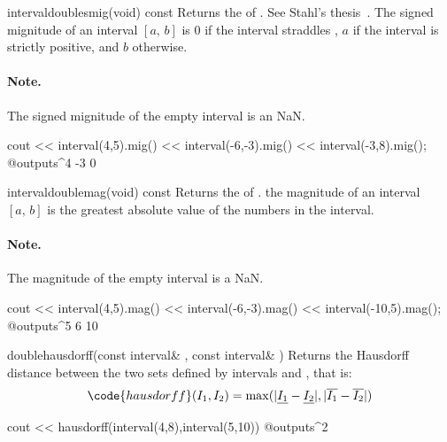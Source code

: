 \documentclass{manual}
\newcommand{\itv}[2]{\ensuremath{[#1,\,#2]}}
\newcommand{\leftBound}[1]{\ensuremath{\underline{#1}}}
\newcommand{\rightBound}[1]{\ensuremath{\overline{#1}}}
\begin{document}
\begin{defmethod}{interval}{double}{smig}{(void) const}
  Returns the  of .  See Stahl's
  thesis~. The signed mignitude of
  an interval \itv{a}{b} is $0$ if the interval straddles ,
  $a$ if the interval is strictly positive, and $b$ otherwise.

\paragraph{Note.} The signed mignitude of the empty interval is an NaN.
\begin{example}
cout << interval(4,5).mig()
     << interval(-6,-3).mig()
     << interval(-3,8).mig();
@outputs^4 -3 0~
\end{example}
\end{defmethod}

\begin{defmethod}{interval}{double}{mag}{(void) const}
  Returns the  of . the magnitude of an
  interval \itv{a}{b} is the greatest absolute value of the numbers in
  the interval.

\paragraph{Note.} The magnitude of the empty interval is a NaN.
\begin{example}
cout << interval(4,5).mag()
     << interval(-6,-3).mag()
     << interval(-10,5).mag();
@outputs^5 6 10~
\end{example}
\end{defmethod}

\begin{deffun}{double}{hausdorff}{(const interval\& , const interval\& )}
  Returns the Hausdorff distance between the two sets defined by intervals  and
  , that is:
\begin{equation*}
\code{hausdorff}(I_1,I_2)=\max(|\leftBound{I_1}-\leftBound{I_2}|,
                          |\rightBound{I_1}-\rightBound{I_2}|)
\end{equation*}
\begin{example}
cout << hausdorff(interval(4,8),interval(5,10))
@outputs^2~
\end{example}
\end{deffun}
\end{document}
